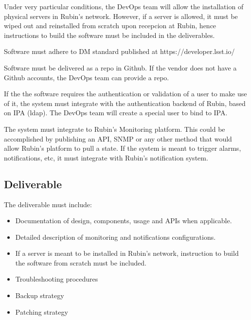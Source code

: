 Under very particular conditions, the DevOps team will allow the installation of physical servers in Rubin's network. However, if a server is allowed, it must be wiped out and reinstalled from scratch upon recepcion at Rubin, hence instructions to build the software must be included in the deliverables. 

Software must adhere to DM standard published at https://developer.lsst.io/

Software must be delivered as a repo in Github. If the vendor does not have a Github accounts, the DevOps team can provide a repo. 

If the the software requires the authentication or validation of a user to make use of it, the system must integrate with the authentication backend of Rubin, based on IPA (ldap). The DevOps team will create a special user to bind to IPA. 

The system must integrate to Rubin’s Monitoring platform. This could be accomplished by publishing an API, SNMP or any other method that would allow Rubin’s platform to pull a state. If the system is meant to trigger alarms, notifications, etc, it must integrate with Rubin’s notification system. 

\subsection{Deliverable}

The deliverable must include:

\begin{itemize}
    \item Documentation of design, components, usage and APIs when applicable.
    \item  Detailed description of monitoring and notifications configurations. 
    \item If a server is meant to be installed in Rubin's network, instruction to build the software from scratch must be included. 
    \item Troubleshooting procedures
    \item Backup strategy
    \item Patching strategy	
\end{itemize}
	


